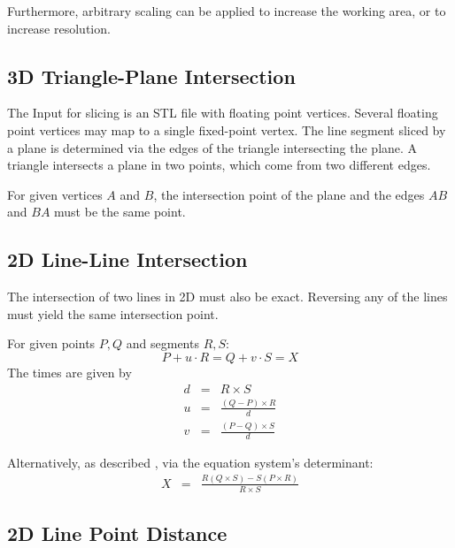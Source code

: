 \documentclass[12pt,a4paper,oneside,openany]{article}
\begin{document}
Furthermore, arbitrary scaling can be applied to increase the working area, or to increase resolution.

\subsection{3D Triangle-Plane Intersection}

The Input for slicing is an STL file with floating point vertices. Several floating point vertices may map to a single fixed-point vertex. The line segment sliced by a plane is determined via the edges of the triangle intersecting the plane. A triangle intersects a plane in two points, which come from two different edges.

For given vertices $A$ and $B$, the intersection point of the plane and the edges $AB$ and $BA$ must be the same point.

\subsection{2D Line-Line Intersection}

The intersection of two lines in 2D must also be exact. Reversing any of the lines must yield the same intersection point.

For given points $P,Q$ and segments $R,S$: $$ P + u\cdot R = Q + v \cdot S = X$$
The times are given by
\begin{eqnarray*}
d &=& R \times S \\
u &=& \frac{(Q-P) \times R}{d} \\
v &=& \frac{(P-Q) \times S}{d}
\end{eqnarray*}

Alternatively, as described \cite{mw:lli}, via the equation system's determinant:
\begin{eqnarray*}
X &=& \frac{R (Q \times S )  - S (P \times R )}{R \times S}
\end{eqnarray*}


\subsection{2D Line Point Distance}

\end{document}
